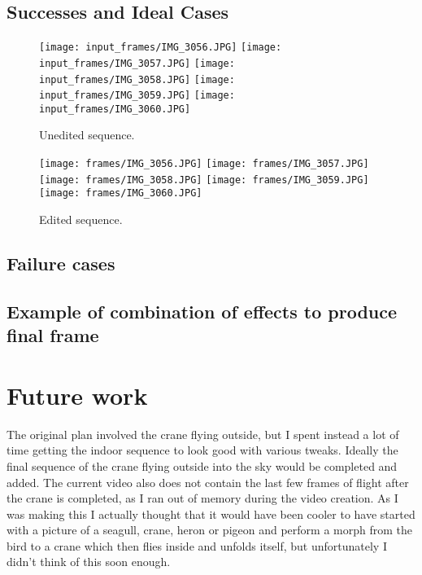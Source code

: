 \documentclass[12pt]{article}
\begin{document}
        \subsection{Successes and Ideal Cases}
            \begin{figure}[H]
                \centering
                \texttt{[image: input\_frames/IMG\_3056.JPG]}
                \texttt{[image: input\_frames/IMG\_3057.JPG]}
                \texttt{[image: input\_frames/IMG\_3058.JPG]}
                \texttt{[image: input\_frames/IMG\_3059.JPG]}
                \texttt{[image: input\_frames/IMG\_3060.JPG]}
                \caption{Unedited sequence.}
            \end{figure}
            \begin{figure}[H]
                \centering
                \texttt{[image: frames/IMG\_3056.JPG]}
                \texttt{[image: frames/IMG\_3057.JPG]}
                \texttt{[image: frames/IMG\_3058.JPG]}
                \texttt{[image: frames/IMG\_3059.JPG]}
                \texttt{[image: frames/IMG\_3060.JPG]}
                \caption{Edited sequence.}
            \end{figure}
            
        \subsection{Failure cases}
        \subsection{Example of combination of effects to produce final frame}
    \section{Future work}
        The original plan involved the crane flying outside, but I spent instead a lot of time getting the indoor sequence to look good with various tweaks.  Ideally the final sequence of the crane flying outside into the sky would be completed and added.  The current video also does not contain the last few frames of flight after the crane is completed, as I ran out of memory during the video creation.  As I was making this I actually thought that it would have been cooler to have started with a picture of a seagull, crane, heron or pigeon and perform a morph from the bird to a crane which then flies inside and unfolds itself, but unfortunately I didn't think of this soon enough.

    \nocite{grabcut}
    \nocite{telea}
    \nocite{ns}
    \nocite{poisson}

    
    
\end{document}
